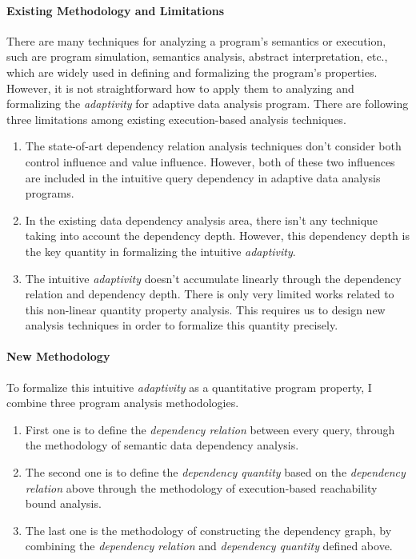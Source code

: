 \paragraph{Existing Methodology and Limitations}
There are many techniques for analyzing a program's semantics or execution, such are program simulation, 
semantics analysis, abstract interpretation, etc., which are widely used in defining
and formalizing the program's properties.
However, it is not straightforward how to apply them to analyzing and formalizing the \emph{adaptivity}
for adaptive data analysis program.
There are following three limitations among existing execution-based analysis techniques.
\begin{enumerate}
\item The state-of-art dependency relation analysis techniques don't
consider both control influence and value influence. However, both of these
two influences are included in the intuitive query dependency 
in adaptive data analysis programs.
\item In the existing data dependency analysis area, there isn't any technique taking into account
the dependency depth. However, this dependency depth is the key quantity in formalizing the intuitive \emph{adaptivity}.
\item The intuitive \emph{adaptivity} doesn't accumulate linearly through the dependency relation and 
dependency depth. There is only very limited works related to this non-linear quantity property analysis.
This requires us to design new analysis techniques in order to formalize this quantity precisely.
\end{enumerate}
%
\paragraph{New Methodology}
 To formalize this intuitive \emph{adaptivity} as a quantitative program property, 
I combine three program analysis methodologies.
\begin{enumerate}
   \item First one is to define the \emph{dependency relation} between every query, 
   through the methodology of semantic data dependency analysis.
   \item The second one is to define the \emph{dependency quantity} 
  based on the \emph{dependency relation} above through the methodology of execution-based reachability bound analysis.
   \item The last one is the methodology of constructing the dependency graph, by combining the \emph{dependency relation} and \emph{dependency quantity} defined above.
      \end{enumerate}
